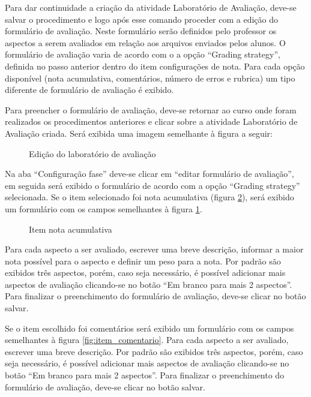 Para dar continuidade a criação da atividade Laboratório de Avaliação, deve-se salvar o procedimento e logo após esse comando proceder com a edição do formulário de avaliação. Neste formulário serão definidos pelo professor os aspectos a serem avaliados em relação aos arquivos enviados pelos alunos. O formulário de avaliação varia de acordo com o a opção “Grading strategy”, definida no passo anterior dentro do item configurações de nota. Para cada opção disponível (nota acumulativa, comentários, número de erros e rubrica) um tipo diferente de formulário de avaliação é exibido.

Para preencher o formulário de avaliação, deve-se retornar ao curso onde foram realizados os procedimentos anteriores e clicar sobre a atividade Laboratório de Avaliação criada. Será exibida uma imagem semelhante à figura a seguir:

\begin{figure}
 \begin{center}
  \caption{Edição do laboratório de avaliação}
  \label{fig:edit_lab_ava}
 \end{center}
\end{figure}

Na aba “Configuração fase” deve-se clicar em “editar formulário de avaliação”, em seguida será exibido o formulário de acordo com a opção “Grading strategy” selecionada. Se o item selecionado foi nota acumulativa (figura \ref{fig:item_nota_acumulativa}), será exibido um formulário com os campos semelhantes à figura \ref{fig:edit_lab_ava}.

\begin{figure}
 \begin{center}
  \caption{Item nota acumulativa}
  \label{fig:item_nota_acumulativa}
 \end{center}
\end{figure}

Para cada aspecto a ser avaliado, escrever uma breve descrição, informar a maior nota possível para o aspecto e definir um peso para a nota. Por padrão são exibidos três aspectos, porém, caso seja necessário, é possível adicionar mais aspectos de avaliação clicando-se no botão “Em branco para mais 2 aspectos”. Para finalizar o preenchimento do formulário de avaliação, deve-se clicar no botão salvar.

Se o item escolhido foi comentários será exibido um formulário com os campos semelhantes à figura \ref{fig:item_comentario}. Para cada aspecto a ser avaliado, escrever uma breve descrição. Por padrão são exibidos três aspectos, porém, caso seja necessário, é possível adicionar mais aspectos de avaliação clicando-se no botão “Em branco para mais 2 aspectos”. Para finalizar o preenchimento do formulário de avaliação, deve-se clicar no botão salvar.


